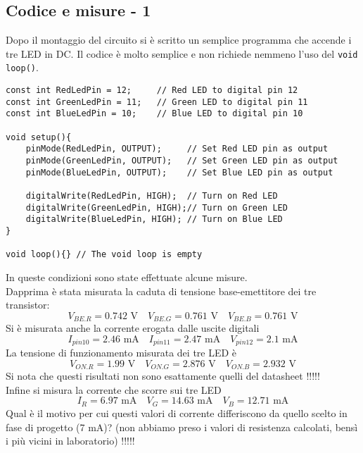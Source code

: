 \subsection{Codice e misure - 1}
Dopo il montaggio del circuito si è scritto un semplice programma che accende i tre LED in DC. Il codice è molto semplice e non richiede nemmeno l'uso del \texttt{void loop()}.
\begin{lstlisting}[frame=single, language=Arduino]
const int RedLedPin = 12;     // Red LED to digital pin 12
const int GreenLedPin = 11;   // Green LED to digital pin 11
const int BlueLedPin = 10;    // Blue LED to digital pin 10

void setup(){
    pinMode(RedLedPin, OUTPUT);     // Set Red LED pin as output
    pinMode(GreenLedPin, OUTPUT);   // Set Green LED pin as output
    pinMode(BlueLedPin, OUTPUT);    // Set Blue LED pin as output
    
    digitalWrite(RedLedPin, HIGH);  // Turn on Red LED
    digitalWrite(GreenLedPin, HIGH);// Turn on Green LED
    digitalWrite(BlueLedPin, HIGH); // Turn on Blue LED
}

void loop(){} // The void loop is empty
\end{lstlisting}
In queste condizioni sono state effettuate alcune misure.\\ 
Dapprima è stata misurata la caduta di tensione base-emettitore dei tre transistor:
\begin{equation*}
    V_{BE.R}=0.742\text{ V}\quad V_{BE.G}=0.761\text{ V}\quad V_{BE.B}=0.761\text{ V}
\end{equation*}
Si è misurata anche la corrente erogata dalle uscite digitali
\begin{equation*}
    I_{pin10}=2.46\text{ mA}\quad I_{pin11}=2.47\text{ mA}\quad V_{pin12}=2.1\text{ mA}
\end{equation*}
La tensione di funzionamento misurata dei tre LED è
\begin{equation*}
    V_{ON.R}=1.99\text{ V}\quad V_{ON.G}=2.876\text{ V}\quad V_{ON.B}=2.932\text{ V}
\end{equation*}
Si nota che questi risultati non sono esattamente quelli del datasheet !!!!!\\
Infine si misura la corrente che scorre sui tre LED
\begin{equation*}
    I_{R}=6.97\text{ mA}\quad V_{G}=14.63\text{ mA}\quad V_{B}=12.71\text{ mA}
\end{equation*}
Qual è il motivo per cui questi valori di corrente differiscono da quello scelto in fase di progetto (7 mA)?
(non abbiamo preso i valori di resistenza calcolati, bensì i più vicini in laboratorio) !!!!!

